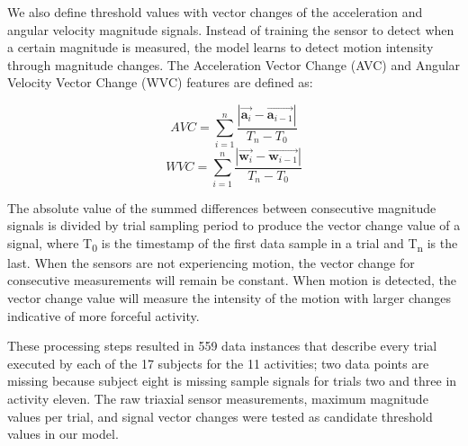 \documentclass{llncs}
\begin{document}
\begin{table}
\begin{center}
\begin{tabular}{|c|c|c|}
			\bottomrule
		\end{tabular}
	\end{center}
\end{table}

	We also define threshold values with vector changes of the acceleration and angular velocity magnitude signals. Instead of training the sensor to detect when a certain magnitude is measured, the model learns to detect motion intensity through magnitude changes. The Acceleration Vector Change (AVC) and Angular Velocity Vector Change (WVC) features are defined as:

	\begin{equation*}
    		AVC = \sum\limits_{i=1}^n \frac{| \vec{\mathbf{a}_{i}} - \vec{\mathbf{a}_{i-1}} |}{T_{n} - T_{0}}
	\end{equation*} 
	\begin{equation*}
		WVC = \sum\limits_{i=1}^n \frac{| \vec{\mathbf{w}_{i}} - \vec{\mathbf{w}_{i-1}} |}{T_{n} - T_{0}}
	\end{equation*} 

	The absolute value of the summed differences between consecutive magnitude signals is divided by trial sampling period to produce the vector change value of a signal, where T\textsubscript{0} is the timestamp of the first data sample in a trial and T\textsubscript{n} is the last. When the sensors are not experiencing motion, the vector change for consecutive measurements will remain be constant. When motion is detected, the vector change value will measure the intensity of the motion with larger changes indicative of more forceful activity. 
	
	These processing steps resulted in 559 data instances that describe every trial executed by each of the 17 subjects for the 11 activities; two data points are missing because subject eight is missing sample signals for trials two and three in activity eleven. The raw triaxial sensor measurements, maximum magnitude values per trial, and signal vector changes were tested as candidate threshold values in our model. 
	

\end{document}
